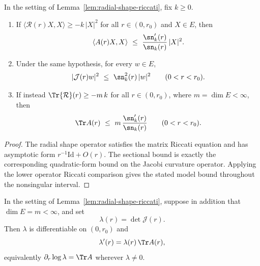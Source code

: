 \begin{lemma}
\label{lem:radial-comparison}
\leanok



In the setting of Lemma~\ref{lem:radial-shape-riccati}, fix $k\ge0$.
\begin{enumerate}
\item If $\langle{\mathcal R}(r)X,X\rangle\ge-k\,|X|^2$ for all
$r\in(0,r_0)$ and $X\in E$, then
$$\langle A(r)X,X\rangle\ \le\ \frac{\sn_k'(r)}{\sn_k(r)}\,|X|^2 .$$
\item Under the same hypothesis, for every $w\in E$,
$$|{\mathcal J}(r)w|^2\ \le\ \sn_k^2(r)\,|w|^2\qquad(0<r<r_0).$$
\item If instead $\Tr{\mathcal R}(r)\ge-m\,k$ for all $r\in(0,r_0)$,
where $m=\dim E<\infty$, then
$$\Tr A(r)\ \le\ m\,\frac{\sn_k'(r)}{\sn_k(r)}\qquad(0<r<r_0).$$
\end{enumerate}
\end{lemma}

\begin{proof}
\sketch
{}
\leanok
The radial shape operator satisfies the matrix Riccati equation and has asymptotic form $r^{-1}\mathrm{Id}+O(r)$. The sectional bound is exactly the corresponding quadratic-form bound on the Jacobi curvature operator. Applying the lower operator Riccati comparison gives the stated model bound throughout the nonsingular interval.
\end{proof}

\begin{lemma}
\label{lem:radial-volume-element}
\leanok



In the setting of Lemma~\ref{lem:radial-shape-riccati}, suppose in addition
that $\dim E=m<\infty$, and set
$$\lambda(r)=\det{\mathcal J}(r).$$
Then $\lambda$ is differentiable on $(0,r_0)$ and
$$\lambda'(r)=\lambda(r)\,\Tr A(r),$$
equivalently $\partial_r\log\lambda=\Tr A$ wherever $\lambda\ne0$.
\end{lemma}


